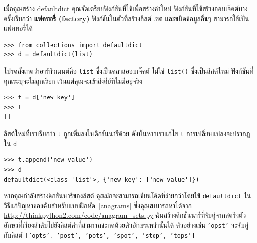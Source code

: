 
เมื่อคุณสร้าง defaultdict คุณจัดเตรียมฟังก์ชันที่ใช้เพื่อสร้างค่าใหม่ ฟังก์ชันที่ใช้สร้างออบเจ๊คต์บางครั้งเรียกว่า {\bf แฟคทอรี่ (factory)} 
ฟังก์ชันในตัวที่สร้างลิสต์ เซต และชนิดข้อมูลอื่นๆ สามารถใช้เป็นแฟคทอรี่ได้

\begin{verbatim}
>>> from collections import defaultdict
>>> d = defaultdict(list)
\end{verbatim}

โปรดสังเกตว่าอาร์กิวเมนต์คือ {\tt list} ซึ่งเป็นคลาสออบเจ๊คต์ ไม่ใช่ {\tt list()} ซึ่งเป็นลิสต์ใหม่ 
ฟังก์ชันที่คุณระบุจะไม่ถูกเรียก เว้นแต่คุณจะเข้าถึงคีย์ที่ไม่มีอยู่จริง


\begin{verbatim}
>>> t = d['new key']
>>> t
[]
\end{verbatim}

ลิสต์ใหม่ที่เราเรียกว่า {\tt t} ถูกเพิ่มลงในดิกชันนารีด้วย ดังนั้นหากเราแก้ไข {\tt t} การเปลี่ยนแปลงจะปรากฏใน {\tt d}

\begin{verbatim}
>>> t.append('new value')
>>> d
defaultdict(<class 'list'>, {'new key': ['new value']})
\end{verbatim}

	
หากคุณกำลังสร้างดิกชันนารีของลิสต์ คุณมักจะสามารถเขียนโค้ดที่ง่ายกว่าโดยใช้ {\tt defaultdict} ในวิธีแก้ปัญหาของฉันสำหรับแบบฝึกหัด~\ref{anagrams} 
ซึ่งคุณสามารถหาได้จาก \url{http://thinkpython2.com/code/anagram_sets.py} 
ฉันสร้างดิกชันนารีที่จับคู่จากสตริงตัวอักษรที่เรียงลำดับไปยังลิสต์คำที่สามารถสะกดด้วยตัวอักษรเหล่านั้นได้ 
ตัวอย่างเช่น {\tt 'opst'} จะจับคู่กับลิสต์ {\tt ['opts', 'post', 'pots', 'spot', 'stop', 'tops']}


